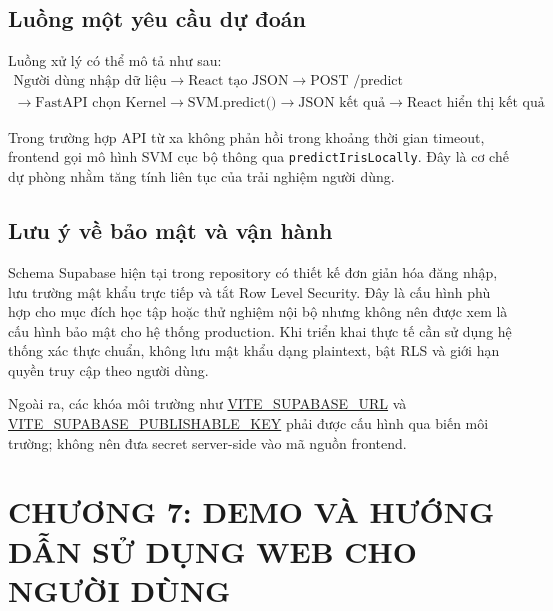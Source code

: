 \documentclass{article}
\begin{document}
	\subsection{Luồng một yêu cầu dự đoán}
	\hspace{0.5cm}
	Luồng xử lý có thể mô tả như sau:
	\begin{multline*}
		\text{Người dùng nhập dữ liệu}
		\rightarrow
		\text{React tạo JSON}
		\rightarrow
		\text{POST /predict}
		\\ 
		\rightarrow
		\text{FastAPI chọn Kernel}
		\rightarrow
		\text{SVM.predict()}
		\rightarrow
		\text{JSON kết quả}
		\rightarrow
		\text{React hiển thị kết quả}
	\end{multline*}
	
	Trong trường hợp API từ xa không phản hồi trong khoảng thời gian timeout, frontend gọi mô hình SVM cục bộ thông qua \texttt{predictIrisLocally}. Đây là cơ chế dự phòng nhằm tăng tính liên tục của trải nghiệm người dùng.
	
	\subsection{Lưu ý về bảo mật và vận hành}
	\hspace{0.5cm}
	Schema Supabase hiện tại trong repository có thiết kế đơn giản hóa đăng nhập, lưu trường mật khẩu trực tiếp và tắt Row Level Security. Đây là cấu hình phù hợp cho mục đích học tập hoặc thử nghiệm nội bộ nhưng không nên được xem là cấu hình bảo mật cho hệ thống production. Khi triển khai thực tế cần sử dụng hệ thống xác thực chuẩn, không lưu mật khẩu dạng plaintext, bật RLS và giới hạn quyền truy cập theo người dùng.
	
	Ngoài ra, các khóa môi trường như \url{VITE_SUPABASE_URL} và \url{VITE_SUPABASE_PUBLISHABLE_KEY} phải được cấu hình qua biến môi trường; không nên đưa secret server-side vào mã nguồn frontend.
	
	\newpage
	\section{\centering CHƯƠNG 7: DEMO VÀ HƯỚNG DẪN SỬ DỤNG WEB CHO NGƯỜI DÙNG}
\end{document}
